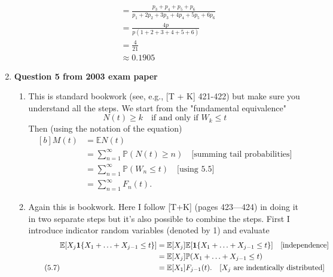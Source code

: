 \documentclass[11pt,a4paper]{article}
\begin{document}
\begin{enumerate}
\begin{enumerate}
\begin{align*}
        &= \frac{p_3 + p_4 + p_5 + p_6}{p_1 + 2p_2 + 3p_3 + 4p_4 + 5p_5 + 6p_6}\\
        &= \frac{4p}{p(1 + 2 + 3 + 4 + 5 + 6)}\\
        &= \frac{4}{21}\\
        &\approx 0.1905
      \end{align*}
    \end{enumerate}
    \item \textbf{Question 5 from 2003 exam paper}
    \begin{enumerate}
      \item This is standard bookwork (see, e.g., [T + K] 421-422) but make sure you understand all the steps. We start from the "fundamental equivalence"
      \begin{equation}\tag{5.5}
        N(t) \geq k\quad \text{if and only if $W_k \leq t$}
      \end{equation}
      Then (using the notation of the equation)
      \begin{equation}\tag{5.6}
        \begin{aligned}[b]
          M(t)
          &= \mathbb{E}N(t)\\
          &= \sum_{n = 1}^\infty\mathbb{P}(N(t)\geq n)\quad \text{[summing tail probabilities]}\\
          &= \sum_{n = 1}^\infty \mathbb{P}(W_n \leq t)\quad \text{[using 5.5]}\\
          &= \sum_{n = 1}^\infty F_n(t).
        \end{aligned}
      \end{equation}
      \item Again this is bookwork. Here I follow [T+K] (pages 423—424) in doing it in two separate steps but it's also possible to combine the steps. First I introduce indicator random variables (denoted by 1) and evaluate
      \begin{equation}\tag{5.7}
        \begin{aligned}[b]
          \mathbb{E}[X_j\vb{1}\{X_1 + \ldots + X_{j - 1}\leq t\}]
          &= \mathbb{E}[X_j]\mathbb{E}[\vb{1}\{X_1 + \ldots + X_{j - 1} \leq t\}]\quad \text{[independence]}\\
          &= \mathbb{E}[X_j]\mathbb{P}(X_1 + \ldots + X_{j - 1} \leq t)\\
          &= \mathbb{E}[X_1]F_{j - 1}(t).\quad \text{[$X_j$ are indentically distributed]}
        \end{aligned}
      \end{equation}

\end{enumerate}
\end{enumerate}
\end{document}
